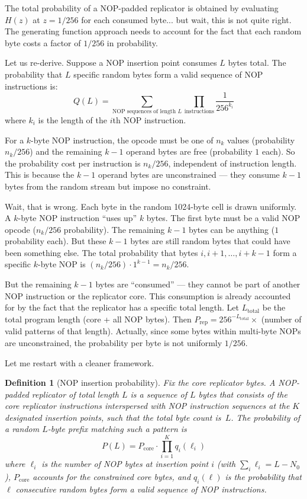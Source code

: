 \documentclass{article}
\newcommand{\Prep}{P_{\mathrm{rep}}}
\newtheorem{definition}{Definition}
\begin{document}
The total probability of a NOP-padded replicator is obtained by
evaluating $H(z)$ at $z = 1/256$ for each consumed byte... but wait,
this is not quite right. The generating function approach needs to
account for the fact that each random byte costs a factor of $1/256$
in probability.

Let us re-derive. Suppose a NOP insertion point consumes $L$ bytes
total. The probability that $L$ specific random bytes form a valid
sequence of NOP instructions is:
\[
  Q(L) = \sum_{\text{NOP sequences of length } L} \prod_{\text{instructions}} \frac{1}{256^{k_i}}
\]
where $k_i$ is the length of the $i$th NOP instruction.

For a $k$-byte NOP instruction, the opcode must be one of $n_k$ values
(probability $n_k/256$) and the remaining $k-1$ operand bytes are free
(probability $1$ each). So the probability cost per instruction is
$n_k / 256$, independent of instruction length. This is because the
$k-1$ operand bytes are unconstrained --- they consume $k-1$ bytes
from the random stream but impose no constraint.

Wait, that is wrong. Each byte in the random 1024-byte cell is drawn
uniformly. A $k$-byte NOP instruction ``uses up'' $k$ bytes. The first
byte must be a valid NOP opcode ($n_k / 256$ probability). The remaining
$k-1$ bytes can be anything ($1$ probability each). But these $k-1$
bytes are still random bytes that could have been something else. The
total probability that bytes $i, i+1, \ldots, i+k-1$ form a specific
$k$-byte NOP is $(n_k / 256) \cdot 1^{k-1} = n_k / 256$.

But the remaining $k-1$ bytes are ``consumed'' --- they cannot be part
of another NOP instruction or the replicator core. This consumption is
already accounted for by the fact that the replicator has a specific
total length. Let $L_{\mathrm{total}}$ be the total program length
(core + all NOP bytes). Then $\Prep = 256^{-L_{\mathrm{total}}} \times$
(number of valid patterns of that length). Actually, since some bytes
within multi-byte NOPs are unconstrained, the probability per byte
is not uniformly $1/256$.

Let me restart with a cleaner framework.

\begin{definition}[NOP insertion probability]
Fix the core replicator bytes. A \emph{NOP-padded replicator of total
length $L$} is a sequence of $L$ bytes that consists of the core
replicator instructions interspersed with NOP instruction sequences
at the $K$ designated insertion points, such that the total byte count
is~$L$. The probability of a random $L$-byte prefix matching such a
pattern is
\[
  P(L) = P_{\mathrm{core}} \cdot \prod_{i=1}^{K} q_i(\ell_i)
\]
where $\ell_i$ is the number of NOP bytes at insertion point $i$
(with $\sum_i \ell_i = L - N_0$), $P_{\mathrm{core}}$ accounts for
the constrained core bytes, and $q_i(\ell)$ is the probability that
$\ell$ consecutive random bytes form a valid sequence of NOP
instructions.
\end{definition}
\end{document}
